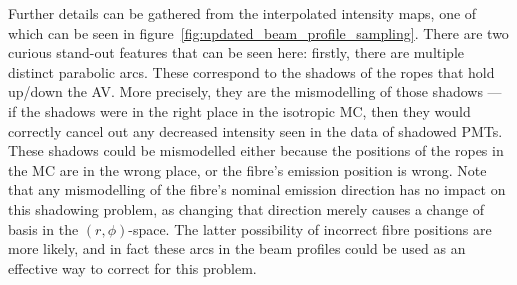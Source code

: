 Further details can be gathered from the interpolated intensity maps, one of which can be seen in figure~\ref{fig:updated_beam_profile_sampling}. There are two curious stand-out features that can be seen here: firstly, there are multiple distinct parabolic arcs. These correspond to the shadows of the ropes that hold up/down the AV. More precisely, they are the mismodelling of those shadows --- if the shadows were in the right place in the isotropic MC, then they would correctly cancel out any decreased intensity seen in the data of shadowed PMTs. These shadows could be mismodelled either because the positions of the ropes in the MC are in the wrong place, or the fibre's emission position is wrong. Note that any mismodelling of the fibre's nominal emission direction has no impact on this shadowing problem, as changing that direction merely causes a change of basis in the $(r,\phi)$-space. The latter possibility of incorrect fibre positions are more likely, and in fact these arcs in the beam profiles could be used as an effective way to correct for this problem.

